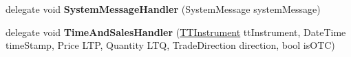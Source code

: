 \begin{DoxyCompactItemize}
\item 
\hypertarget{namespace_e_z_a_p_i_af43b9dbd25c5f34b5e93e8f3fb6b1c8f}{delegate void {\bfseries System\-Message\-Handler} (System\-Message system\-Message)}\label{namespace_e_z_a_p_i_af43b9dbd25c5f34b5e93e8f3fb6b1c8f}

\item 
\hypertarget{namespace_e_z_a_p_i_a4a181f6f2fc307e2e81c78c8a8c87317}{delegate void {\bfseries Time\-And\-Sales\-Handler} (\hyperlink{class_e_z_a_p_i_1_1_containers_1_1_t_t_instrument}{T\-T\-Instrument} tt\-Instrument, Date\-Time time\-Stamp, Price L\-T\-P, Quantity L\-T\-Q, Trade\-Direction direction, bool is\-O\-T\-C)}\label{namespace_e_z_a_p_i_a4a181f6f2fc307e2e81c78c8a8c87317}

\end{DoxyCompactItemize}

